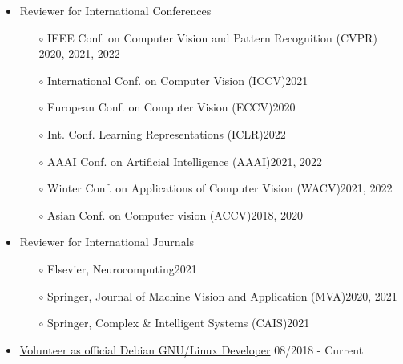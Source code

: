 \documentclass[10pt,margin,line,pifont,palatino,courier]{res}
\begin{document}
\begin{resume}
\begin{itemize}[leftmargin=*]
\item Reviewer for International Conferences
	\begin{itemize}[noitemsep, leftmargin=*]
		\item[$\circ$] IEEE Conf. on Computer Vision and Pattern Recognition (CVPR) \hfill 2020, 2021, 2022
		\item[$\circ$] International Conf. on Computer Vision (ICCV)\hfill 2021
		\item[$\circ$] European Conf. on Computer Vision (ECCV)\hfill 2020
		\item[$\circ$] Int. Conf. Learning Representations (ICLR)\hfill 2022
		\item[$\circ$] AAAI Conf. on Artificial Intelligence (AAAI)\hfill 2021, 2022
		\item[$\circ$] Winter Conf. on Applications of Computer Vision (WACV)\hfill 2021, 2022
		\item[$\circ$] Asian Conf. on Computer vision (ACCV)\hfill 2018, 2020
	\end{itemize}
\item Reviewer for International Journals
	\begin{itemize}[noitemsep, leftmargin=*]
		\item[$\circ$] Elsevier, Neurocomputing\hfill 2021
		\item[$\circ$] Springer, Journal of Machine Vision and Application (MVA)\hfill 2020, 2021
		\item[$\circ$] Springer, Complex \& Intelligent Systems (CAIS)\hfill 2021
	\end{itemize}
\item \href{https://nm.debian.org/person/lumin/}{Volunteer as official Debian GNU/Linux Developer}
	\hfill 08/2018 - Current\\
\end{itemize}

%
%
%


\end{resume}
\end{document}
